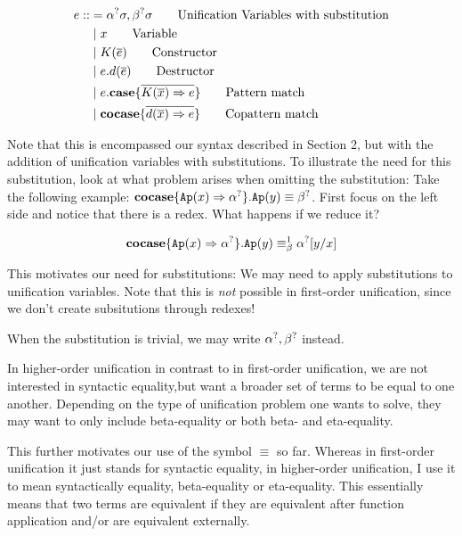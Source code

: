 \documentclass[twoside,12pt,a4paper]{article}
\begin{document}
\begin{definition}
    \begin{align*}
        e  ::&= \alphaunifvar\sigma, \betaunifvar\sigma \tag*{Unification Variables with substitution}\\ %
            &\partition x  \tag*{Variable} \\
            &\partition\constructor \tag*{Constructor} \\
            &\partition\destructor  \tag*{Destructor}\\
            &\partition\patmatch  \tag*{Pattern match}\\
            &\partition\copatmatch  \tag*{Copattern match}
    \end{align*}
\end{definition}

Note that this is encompassed our syntax described in Section 2, %
but with the addition of unification variables with substitutions. 
To illustrate the need for this substitution, look at what problem arises when omitting the substitution:
Take the following example: $\textbf{cocase}\{\texttt{Ap}(x)\Rightarrow\alpha^?\}.\texttt{Ap}(y)\equiv\beta^?$. 
First focus on the left side and notice that there is a redex. What happens if we reduce it?

\begin{align*}
    \textbf{cocase}\{\texttt{Ap}(x)\Rightarrow\alpha^?\}.\texttt{Ap}(y)\equiv_{\beta}^1\alpha^?[y/x]    
\end{align*}

This motivates our need for substitutions: We may need to apply substitutions to unification variables.
Note that this is \textit{not} possible in first-order unification, since we don't create subsitutions through redexes! 

When the substitution is trivial, we may  write $\alpha^?, \beta^?$ instead.

In higher-order unification in contrast to in first-order unification, we are not interested in syntactic equality,but want a broader set of terms to be equal to one another.
Depending on the type of unification problem one wants to solve, they may want to only include beta-equality or both 
beta- and eta-equality.

This further motivates our use of the symbol $\equiv$ so far. Whereas in first-order unification it just stands for syntactic equality, 
in higher-order unification, I use it to mean syntactically equality, beta-equality or eta-equality.
This essentially means that two terms are equivalent if they are equivalent after function application and/or are equivalent externally.
\end{document}
